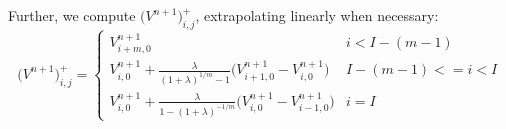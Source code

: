 \documentclass[12pt,english]{article}
\theoremstyle{remark}
\begin{document}
Further, we compute $\big(V^{n+1}\big)^+_{i,j}$, extrapolating linearly when necessary:
\[ \big(V^{n+1}\big)^+_{i,j} = \begin{cases} 
V^{n+1}_{i+m,0} & i < I - (m-1) \\
V^{n+1}_{i,0} + \frac{\lambda}{(1+\lambda)^{1/m} -1}\big( V^{n+1}_{i+1,0} - V^{n+1}_{i,0} \big) & I - (m-1) <= i < I \\
V^{n+1}_{i,0} + \frac{\lambda}{1-(1+\lambda)^{-1/m}}\big( V^{n+1}_{i,0} - V^{n+1}_{i-1,0} \big) & i = I 

\end{cases}
\]

\begin{comment}

Grouping like terms, have the expression 
\begin{align*}
(V^{n+1})^+_{i,j} &= \mathbbm{1}_{\{i<I-(m-1)\}} V_{i+m,0}^{n+1} \\
&+ \mathbbm{1}_{\{I-(m-1) \le i < I\}} \Big(  \big(1-\frac{\lambda}{(1+\lambda)^{1/m} - 1}\big) V_{i,0}^{n+1} + \frac{\lambda}{(1+\lambda)^{1/m}-1} V_{i+1,0}^{n+1}  \Big) \\
&+ \mathbbm{1}_{\{i=I\}} \Big( \big( 1 + \frac{\lambda}{1-(1+\lambda)^{-1/m}} \big) V_{i,0}^{n+1} - \frac{\lambda}{1-(1+\lambda)^{-1/m}} V_{i-1,0}^{n+1}  \Big)
\end{align*}

\section{Computing the stationary distribution}

\subsection{Simulation}

\subsection{Kolmogorov Forward Equations}

The Kolmogorov Forward equation is (need to prove)
\begin{align*}
0 &= - \partial_q \big(a^q (q,m) \mu (q,m) \big) - \partial_m \big( a^m (q,m) \mu (q,m) \big) \\
  & - s(q,m) \mu(q,m) \\
  &+ \mathbbm{1}_{\{m=0\}} (1+\lambda)^{-1}\int_0^{\infty} s((1+\lambda)^{-1}q,m') \mu(q,m') dm'  
\end{align*}
where $a^q(q,m),a^m(q,m)$ is the drift in the $q,m$ direction, respectively, and $s(q,m)$ is the aggregate innovation rate for a product in state $(q,m)$. Have 
\begin{align*}
a^q(q,m) &= -gq \\
a^m(q,m) &= \nu (z^E(q,m) + (1-x(q,m) z^I(q,m))) \\ 
s(q,m) &= (\chi_I z^I(q,m) + \chi_E z^E(q,m)) \phi (\tau(q,m)) \\ 
\zeta(q,m) &= z^E(q,m) + (1-x(q,m)) z^I(q,m) 
\end{align*}


\end{comment}
\end{document}
